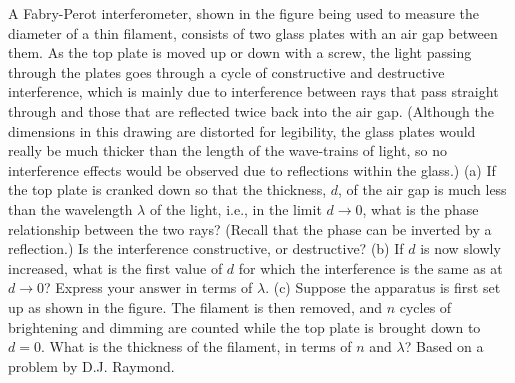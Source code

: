         A Fabry-Perot interferometer, shown in the figure being used
to measure the diameter of a thin filament, consists of two glass plates
with an air gap between them. As the top plate is moved up or down
with a screw, the light passing through the plates goes through a cycle
of constructive and destructive interference, which is mainly due to
interference between rays that pass straight through and those that are
reflected twice back into the air gap. (Although the dimensions in this
drawing are distorted for legibility, the glass plates would really be much
thicker than the length of the wave-trains of light, so no interference
effects would be observed due to reflections within the glass.)\hwendpart
(a) If the top plate is cranked down so that the thickness, $d$, of
the air gap is much less than the wavelength $\lambda$ of the light, i.e., in the
limit $d \rightarrow 0$,
what is the phase relationship between the two
rays? (Recall that the phase can be inverted by a reflection.) 
Is the interference constructive, or destructive?\hwendpart
(b) If $d$ is now slowly increased, what is the first value of $d$
for which the interference is the same as at $d\rightarrow 0$? Express your
answer in terms of $\lambda$.\hwendpart
(c) Suppose the apparatus is first set up as shown in the figure. The
filament is then removed, and $n$ cycles of brightening and dimming
are counted while the top plate is brought down to $d=0$. What is the
thickness of the filament, in terms of $n$ and $\lambda$?\hwendpart
Based on a problem by D.J. Raymond.
